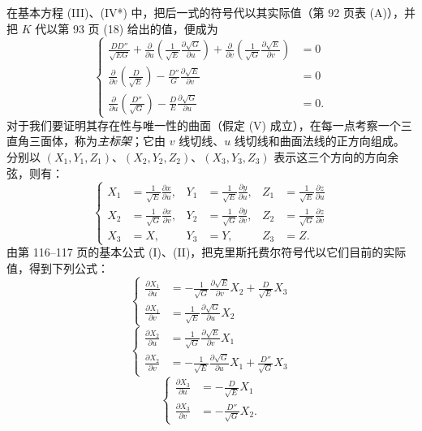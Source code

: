在基本方程 (III)、(IV*) 中，把后一式的符号代以其实际值（第 92 页表 (A)），并把 \(K\) 代以第 93 页 (18) 给出的值，便成为
\begin{equation}\tag{V}
\left\{
\begin{aligned}
 \frac{DD''}{\sqrt{EG}}
 +\frac{\partial}{\partial u}\left(\frac{1}{\sqrt E}
   \frac{\partial\sqrt G}{\partial u}\right)
 +\frac{\partial}{\partial v}\left(\frac{1}{\sqrt G}
   \frac{\partial\sqrt E}{\partial v}\right)&=0\\
 \frac{\partial}{\partial v}\left(\frac{D}{\sqrt E}\right)
 -\frac{D''}{G}\frac{\partial\sqrt E}{\partial v}&=0\\
 \frac{\partial}{\partial u}\left(\frac{D''}{\sqrt G}\right)
 -\frac{D}{E}\frac{\partial\sqrt G}{\partial u}&=0.
\end{aligned}
\right.
\end{equation}
对于我们要证明其存在性与唯一性的曲面（假定 (V) 成立），在每一点考察一个三直角三面体，称为\emph{主标架}；它由 \(v\) 线切线、\(u\) 线切线和曲面法线的正方向组成。分别以 \((X_1,Y_1,Z_1)\)、\((X_2,Y_2,Z_2)\)、\((X_3,Y_3,Z_3)\) 表示这三个方向的方向余弦，则有：
\[
\left\{
\begin{aligned}
 X_1&=\frac{1}{\sqrt E}\frac{\partial x}{\partial u},
 &Y_1&=\frac{1}{\sqrt E}\frac{\partial y}{\partial u},
 &Z_1&=\frac{1}{\sqrt E}\frac{\partial z}{\partial u}\\
 X_2&=\frac{1}{\sqrt G}\frac{\partial x}{\partial v},
 &Y_2&=\frac{1}{\sqrt G}\frac{\partial y}{\partial v},
 &Z_2&=\frac{1}{\sqrt G}\frac{\partial z}{\partial v}\\
 X_3&=X,&Y_3&=Y,&Z_3&=Z.
\end{aligned}
\right.
\]
由第 116–117 页的基本公式 (I)、(II)，把克里斯托费尔符号代以它们目前的实际值，得到下列公式：
\[
\left\{
\begin{aligned}
 \frac{\partial X_1}{\partial u}
 &=-\frac{1}{\sqrt G}\frac{\partial\sqrt E}{\partial v}X_2
   +\frac{D}{\sqrt E}X_3\\
 \frac{\partial X_1}{\partial v}
 &=\frac{1}{\sqrt E}\frac{\partial\sqrt G}{\partial u}X_2
\end{aligned}\right.
\]
\[
\left\{
\begin{aligned}
 \frac{\partial X_2}{\partial u}
 &=\frac{1}{\sqrt G}\frac{\partial\sqrt E}{\partial v}X_1\\
 \frac{\partial X_2}{\partial v}
 &=-\frac{1}{\sqrt E}\frac{\partial\sqrt G}{\partial u}X_1
   +\frac{D''}{\sqrt G}X_3
\end{aligned}\right.
\]
\[
\left\{
\begin{aligned}
 \frac{\partial X_3}{\partial u}
 &=-\frac{D}{\sqrt E}X_1\\
 \frac{\partial X_3}{\partial v}
 &=-\frac{D''}{\sqrt G}X_2.
\end{aligned}\right.
\]
